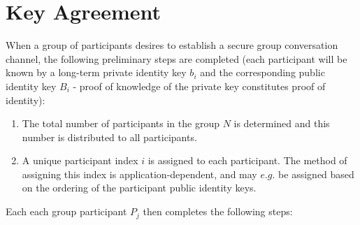 \documentclass[%
preprint,
amsmath,amssymb,
aps,
prb,
floatfix,
]{revtex4-1}
\begin{document}
\section{\label{sec:keyagreement}Key Agreement}
When a group of participants desires to establish a secure group conversation
channel, the following preliminary steps are completed (each participant will be
known by a long-term private identity key $b_i$ and the corresponding public identity
key $B_i$ - proof of knowledge of the private key constitutes proof of identity):
\begin{enumerate}
\item The total number of participants in the group $N$ is determined and this
number is distributed to all participants.
\item A unique participant index $i$ is assigned to each participant. The method of
assigning this index is application-dependent, and may $e.g.$ be assigned based
on the ordering of the participant public identity keys.
\end{enumerate}
Each each group participant $P_j$ then completes the following steps:
\end{document}
